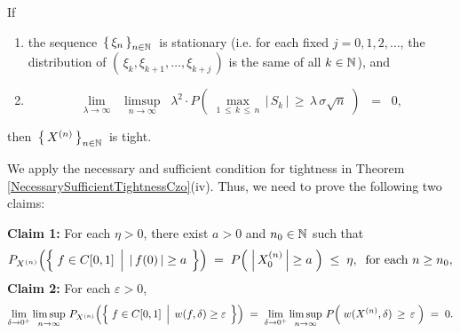 \begin{lemma}
\begin{itemize}
\end{itemize}
If
\begin{enumerate}
\item	the sequence \,$\left\{\,\xi_{n}\,\right\}_{n\in\mathbb{N}}$\, is stationary
		\vskip 0.1cm
		(i.e. for each fixed $j = 0, 1, 2, \ldots$,
		the distribution of $\left(\,\xi_{k},\xi_{k+1},\ldots,\xi_{k+j}\,\right)$ is the same of all $k\in\mathbb{N}$), and
\item	\begin{equation*}
		\underset{\lambda\rightarrow\infty}{\lim}\;\;
		\underset{n\rightarrow\infty}{\limsup}\;\;
		\lambda^{2}\cdot
		P\!\left(\;\underset{1\,\leq\,k\,\leq\,n}{\max}\,\vert\,S_{k}\,\vert\,\geq\,\lambda\,\sigma\sqrt{n}\;\right)
		\;\;=\;\; 0,
		\end{equation*}
\end{enumerate}
then \,$\left\{\,X^{(n)}\,\right\}_{n\in\mathbb{N}}$\, is tight.
\end{lemma}
\proof
We apply the necessary and sufficient condition for tightness in Theorem \ref{NecessarySufficientTightnessCzo}(iv).
Thus, we need to prove the following two claims:

\vskip 0.3cm
\begin{center}
\begin{minipage}{6.5in}
\noindent
\textbf{Claim 1:}\quad
For each $\eta > 0$, there exist $a > 0$ and $n_{0} \in \mathbb{N}$ such that
\begin{equation*}
	P_{X^{(n)}}\!\left(\left\{\;
		f \in \Czo
		\;\left\vert\;\,
		\vert\,f(0)\,\vert \overset{{\color{white}.}}{\geq} a
		\right.
	\;\right\}\right)
	\;=\;
	P\!\left(\; \left\vert\,X^{(n)}_{0}\,\right\vert \overset{{\color{white}.}}{\geq} a \;\right)
	\;\leq\; \eta,
	\;\;\textnormal{for each $n \geq n_{0}$},
\end{equation*}
\vskip 0.3cm
\noindent
\textbf{Claim 2:}\quad
For each $\varepsilon > 0$,
\begin{equation*}
	\lim_{\delta\rightarrow 0^{+}}
	\limsup_{n\rightarrow\infty}\,
	P_{X^{(n)}}\!\left(\left\{\;
		f \in \Czo
		\;\left\vert\;\,
		w(f,\delta) \overset{{\color{white}.}}{\geq} \varepsilon
		\right.
	\;\right\}\right)
	\;=\;
	\lim_{\delta\rightarrow 0^{+}}
	\limsup_{n\rightarrow\infty}\,
	P\!\left(\; w(X^{(n)},\delta) \,\overset{{\color{white}.}}{\geq}\, \varepsilon \;\right)
	\;=\; 0.		
\end{equation*}
\end{minipage}
\end{center}

